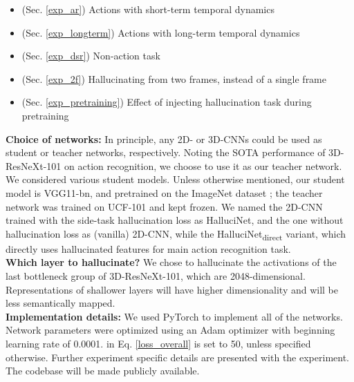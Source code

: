 \documentclass[10pt,twocolumn,letterpaper]{article}
\begin{document}
\begin{itemize}[noitemsep]
\item (Sec. \ref{exp_ar}) Actions with short-term temporal dynamics 
\item (Sec. \ref{exp_longterm}) Actions with long-term temporal dynamics 
\item (Sec. \ref{exp_dsr}) Non-action task 
\item (Sec. \ref{exp_2f}) Hallucinating from two frames, instead of a single frame 
\item (Sec. \ref{exp_pretraining}) Effect of injecting hallucination task during pretraining 
\end{itemize} 

\noindent\textbf{Choice of networks:} In principle, any 2D- or 3D-CNNs could be used as student or teacher networks, respectively.  Noting the SOTA performance of 3D-ResNeXt-101 \cite{kensho} on action recognition, we choose to use it as our teacher network. We considered various student models. Unless otherwise mentioned, our student model is VGG11-bn, and pretrained on the ImageNet dataset \cite{imagenet}; the teacher network was trained on UCF-101 \cite{ucf101} and kept frozen. We named the 2D-CNN trained with the side-task hallucination loss as HalluciNet, and the one without hallucination loss as (vanilla) 2D-CNN, while the HalluciNet\textsubscript{direct} variant, which directly uses hallucinated features for main action recognition task. \\

\noindent\textbf{Which layer to hallucinate?} We chose to hallucinate the activations of the last bottleneck group of 3D-ResNeXt-101, which are 2048-dimensional. Representations of shallower layers will have higher dimensionality and will be less semantically mapped. \\

\noindent\textbf{Implementation details:} We used PyTorch \cite{pytorch} to implement all of the networks. Network parameters were optimized using an Adam optimizer \cite{adam} with beginning learning rate of 0.0001.  in Eq. \ref{loss_overall} is set to 50, unless specified otherwise. Further experiment specific details are presented with the experiment.  The codebase will be made publicly available. \\
\end{document}
